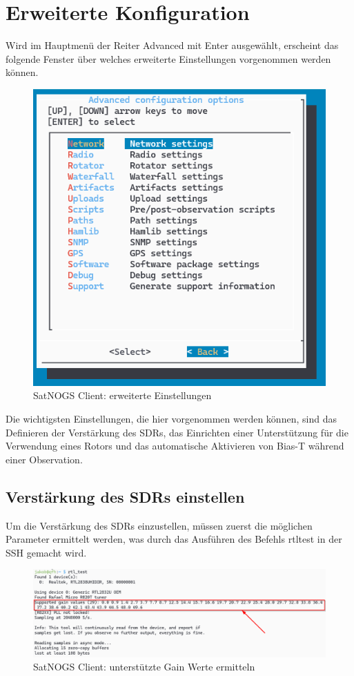 \section{Erweiterte Konfiguration} 
Wird im Hauptmenü der Reiter \glqq Advanced\grqq{} mit \glqq Enter\grqq{} ausgewählt, erscheint das folgende Fenster über welches erweiterte Einstellungen vorgenommen werden können. 

\begin{figure} [H]
	\centering
	\includegraphics[width=.5\linewidth]{../ref/advanced_settings.png}
	\caption{SatNOGS Client: erweiterte Einstellungen}
	\label{fig:advanced_settings}
\end{figure}

Die wichtigsten Einstellungen, die hier vorgenommen werden können, sind das Definieren der Verstärkung des SDRs, das Einrichten einer Unterstützung für die Verwendung eines Rotors und das automatische Aktivieren von Bias-T während einer Observation.

\subsection{Verstärkung des SDRs einstellen}
Um die Verstärkung des SDRs einzustellen, müssen zuerst die möglichen Parameter ermittelt werden, was durch das Ausführen des Befehls \glqq rtl\textunderscore test\grqq{} in der SSH gemacht wird. 

\begin{figure} [H]
	\centering
	\includegraphics[width=\linewidth]{../ref/supportedgain.png}
	\caption{SatNOGS Client: unterstützte Gain Werte ermitteln}
	\label{fig:supportedgain}
\end{figure}

